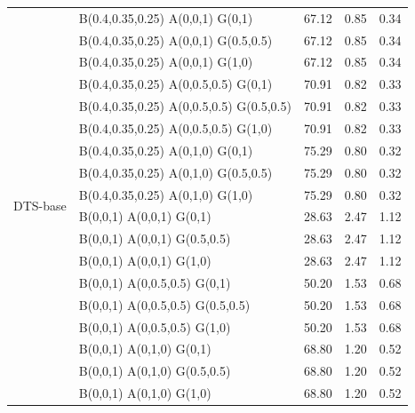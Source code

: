\documentclass[12pt]{article}
\begin{document}
\begin{longtable}{llccc}
\multirow{18}{*}{DTS-base}
& B(0.4,0.35,0.25) A(0,0,1) G(0,1) & 67.12 & 0.85 & 0.34 \\
& B(0.4,0.35,0.25) A(0,0,1) G(0.5,0.5) & 67.12 & 0.85 & 0.34 \\
& B(0.4,0.35,0.25) A(0,0,1) G(1,0) & 67.12 & 0.85 & 0.34 \\
& B(0.4,0.35,0.25) A(0,0.5,0.5) G(0,1) & 70.91 & 0.82 & 0.33 \\
& B(0.4,0.35,0.25) A(0,0.5,0.5) G(0.5,0.5) & 70.91 & 0.82 & 0.33 \\
& B(0.4,0.35,0.25) A(0,0.5,0.5) G(1,0) & 70.91 & 0.82 & 0.33 \\
& B(0.4,0.35,0.25) A(0,1,0) G(0,1) & 75.29 & 0.80 & 0.32 \\
& B(0.4,0.35,0.25) A(0,1,0) G(0.5,0.5) & 75.29 & 0.80 & 0.32 \\
& B(0.4,0.35,0.25) A(0,1,0) G(1,0) & 75.29 & 0.80 & 0.32 \\
& B(0,0,1) A(0,0,1) G(0,1) & 28.63 & 2.47 & 1.12 \\
& B(0,0,1) A(0,0,1) G(0.5,0.5) & 28.63 & 2.47 & 1.12 \\
& B(0,0,1) A(0,0,1) G(1,0) & 28.63 & 2.47 & 1.12 \\
& B(0,0,1) A(0,0.5,0.5) G(0,1) & 50.20 & 1.53 & 0.68 \\
& B(0,0,1) A(0,0.5,0.5) G(0.5,0.5) & 50.20 & 1.53 & 0.68 \\
& B(0,0,1) A(0,0.5,0.5) G(1,0) & 50.20 & 1.53 & 0.68 \\
& B(0,0,1) A(0,1,0) G(0,1) & 68.80 & 1.20 & 0.52 \\
& B(0,0,1) A(0,1,0) G(0.5,0.5) & 68.80 & 1.20 & 0.52 \\
& B(0,0,1) A(0,1,0) G(1,0) & 68.80 & 1.20 & 0.52 \\
\midrule


\end{longtable}
\end{document}
